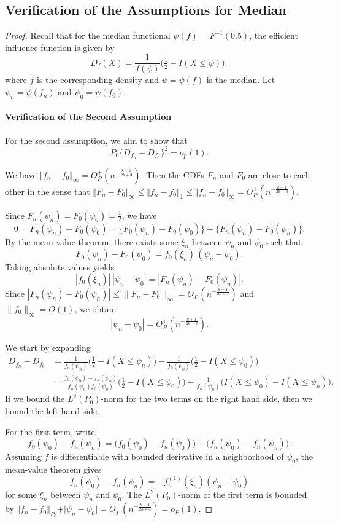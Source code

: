\subsection{Verification of the Assumptions for Median}
\begin{proof}
Recall that for the median functional $\psi(f) = F^{-1}(0.5)$, the efficient influence function is given by
\[
D_f(X) = \frac{1}{f(\psi)} \bigl( \tfrac{1}{2} - I(X \le \psi) \bigr),
\]
where $f$ is the corresponding density and $\psi = \psi(f)$ is the median. Let $\psi_n = \psi(f_n)$ and $\psi_0 = \psi(f_0)$.
\paragraph{Verification of the Second Assumption}
For the second assumption, we aim to show that 
\[
P_0\{D_{f_n} - D_{f_0}\}^2 = o_p(1).
\]

We have $\Vert f_n - f_0\Vert_{\infty} = O_P^+(n^{-\frac{k+1}{2k+3}})$. Then the CDFs $F_n$ and $F_0$ are close to each other in the sense that $\Vert F_n - F_0\Vert_{\infty} \leq \Vert f_n - f_0\Vert_{1} \leq \Vert f_n - f_0\Vert_{\infty} = O_P^+(n^{-\frac{k+1}{2k+3}})$.

Since $F_n(\psi_n) = F_0(\psi_0) = \tfrac{1}{2}$, we have
\[
0 = F_n(\psi_n) - F_0(\psi_0)
  = \{F_0(\psi_n) - F_0(\psi_0)\} + \{F_n(\psi_n) - F_0(\psi_n)\}.
\]
By the mean value theorem, there exists some $\xi_n$ between $\psi_n$ and $\psi_0$ such that
\[
F_0(\psi_n) - F_0(\psi_0) = f_0(\xi_n)\,(\psi_n - \psi_0).
\]
Taking absolute values yields
\[
|f_0(\xi_n)|\,|\psi_n - \psi_0| = |F_n(\psi_n) - F_0(\psi_n)|.
\]
Since $|F_n(\psi_n) - F_0(\psi_n)| \le \|F_n - F_0\|_\infty = O_P^+\!\left(n^{-\frac{k+1}{2k+3}}\right)$
and $\|f_0\|_\infty = O(1)$, we obtain
\[
|\psi_n - \psi_0|
= O_P^+\!\left(n^{-\frac{k+1}{2k+3}}\right).
\]

We start by expanding
\begin{align*}
D_{f_n} - D_{f_0}
&= \frac{1}{f_n(\psi_n)} \bigl( \tfrac{1}{2} - I(X \le \psi_n) \bigr)
 - \frac{1}{f_0(\psi_0)} \bigl( \tfrac{1}{2} - I(X \le \psi_0) \bigr) \\
&= \frac{f_0(\psi_0) - f_n(\psi_n)}{f_n(\psi_n) f_0(\psi_0)} \bigl( \tfrac{1}{2} - I(X \le \psi_0) \bigr)
  + \frac{1}{f_n(\psi_n)} \bigl(I(X \le \psi_0) - I(X \le \psi_n)\bigr).
\end{align*}
If we bound the $L^2(P_0)$-norm for the two terms on the right hand side, then we bound the left hand side.

For the first term, write
\[
f_0(\psi_0) - f_n(\psi_n) = \bigl(f_0(\psi_0) - f_n(\psi_0)\bigr)
   + \bigl(f_n(\psi_0) - f_n(\psi_n)\bigr).
\]
Assuming $f$ is differentiable with bounded derivative in a neighborhood of $\psi_0$, the mean-value theorem gives
\[
f_n(\psi_0) - f_n(\psi_n) = - f_n^{(1)}(\xi_n)(\psi_n - \psi_0)
\]
for some $\xi_n$ between $\psi_n$ and $\psi_0$. The $L^2(P_0)$-norm of the first term is bounded by $\Vert f_n - f_0\Vert_{P_0} + \vert\psi_n - \psi_0\vert = O_P^+(n^{-\frac{k+1}{2k+3}}) = o_P(1)$.


\end{proof}
